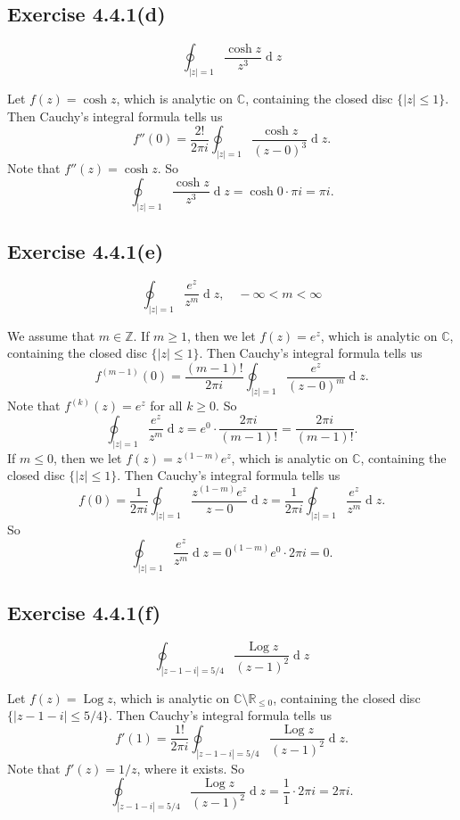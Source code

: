 \documentclass[12pt]{article}
\newenvironment{problem}
    {\begin{lrbox}{\mybox}\begin{minipage}{0.98\textwidth}}
    {\end{minipage}\end{lrbox}\framebox[\textwidth]{\usebox{\mybox}}}
\newcommand{\Z}{\mathbb{Z}} %
\newcommand{\R}{\mathbb{R}} %
\newcommand{\C}{\mathbb{C}} %
\newcommand{\<}{\left\langle} %
\renewcommand{\>}{\right\rangle} %
\newcommand{\Log}{\operatorname{Log}} %
\renewcommand{\d}[1]{\operatorname{d}\!#1} %
\begin{document}
\subsection{Exercise 4.4.1(d)}
\begin{problem}
    \[\oint_{|z| = 1} \frac{\cosh z}{z^3} \d{z}\]
\end{problem}
\medskip

Let $f(z) = \cosh z$, which is analytic on $\C$, containing the closed disc $\{|z| \leq 1\}$. Then Cauchy's integral formula tells us
\[f''(0) = \frac{2!}{2 \pi i} \oint_{|z| = 1} \frac{\cosh z}{(z - 0)^3} \d{z}.\]
Note that $f''(z) = \cosh z$. So
\[\oint_{|z| = 1} \frac{\cosh z}{z^3} \d{z} = \cosh 0 \cdot \pi i = \pi i.\]

\subsection{Exercise 4.4.1(e)}
\begin{problem}
    \[\oint_{|z| = 1} \frac{e^z}{z^m} \d{z}, \quad -\infty < m < \infty\]
\end{problem}
\medskip

We assume that $m \in \Z$. If $m \geq 1$, then we let $f(z) = e^z$, which is analytic on $\C$, containing the closed disc $\{|z| \leq 1\}$. Then Cauchy's integral formula tells us
\[
    f^{(m - 1)}(0) = \frac{(m - 1)!}{2 \pi i} \oint_{|z| = 1} \frac{e^z}{(z - 0)^m} \d{z}.
\]
Note that $f^{(k)}(z) = e^z$ for all $k \geq 0$. So
\[
    \oint_{|z| = 1} \frac{e^z}{z^m} \d{z} = e^0 \cdot \frac{2 \pi i}{(m - 1)!} = \frac{2 \pi i}{(m - 1)!}.
\]
If $m \leq 0$, then we let $f(z) = z^{(1 - m)}e^z$, which is analytic on $\C$, containing the closed disc $\{|z| \leq 1\}$. Then Cauchy's integral formula tells us
\[
    f(0) = \frac{1}{2 \pi i} \oint_{|z| = 1} \frac{z^{(1 - m)}e^z}{z - 0} \d{z} = \frac{1}{2 \pi i} \oint_{|z| = 1} \frac{e^z}{z^m} \d{z}.
\]
So
\[
    \oint_{|z| = 1} \frac{e^z}{z^m} \d{z} = 0^{(1 - m)}e^0 \cdot 2 \pi i = 0.
\]

\newpage
\subsection{Exercise 4.4.1(f)}
\begin{problem}
    \[\oint_{|z - 1 - i| = 5/4} \frac{\Log z}{(z - 1)^2} \d{z}\]
\end{problem}
\medskip

Let $f(z) = \Log z$, which is analytic on $\C \setminus \R_{\leq 0}$, containing the closed disc $\{|z - 1 - i| \leq 5/4\}$. Then Cauchy's integral formula tells us
\[
    f'(1) = \frac{1!}{2 \pi i} \oint_{|z - 1 - i| = 5/4} \frac{\Log z}{(z - 1)^2} \d{z}.
\]
Note that $f'(z) = 1/z$, where it exists. So
\[
    \oint_{|z - 1 - i| = 5/4} \frac{\Log z}{(z - 1)^2} \d{z} = \frac11 \cdot 2 \pi i = 2 \pi i.
\]
\end{document}
